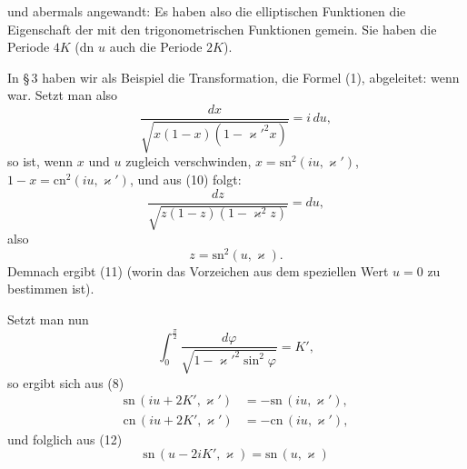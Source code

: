 
und abermals angewandt:
Es haben also die elliptischen Funktionen die Eigenschaft der  mit den trigonometrischen Funktionen gemein. Sie haben die Periode $4K$ (dn $u$ auch die Periode $2K$).

In §\,3 haben wir als Beispiel die Transformation, die Formel (1), abgeleitet:
wenn
war. Setzt man also
\[
\frac{dx}{\sqrt{x(1-x)(1-\varkappa'^2x)}} = i\,du,
\]
so ist, wenn $x$ und $u$ zugleich verschwinden, $x = \mathrm{sn}^2(iu,\varkappa')$, $1-x = \mathrm{cn}^2(iu,\varkappa')$, und aus (10) folgt:
\[
\frac{dz}{\sqrt{z(1-z)(1-\varkappa^2z)}} = du,
\]
also
\[
z = \mathrm{sn}^2(u,\varkappa).
\]
Demnach ergibt (11)
(worin das Vorzeichen aus dem speziellen Wert $u=0$ zu bestimmen ist).

Setzt man nun
\[
\int_0^{\frac{\pi}{2}} \frac{d\varphi}{\sqrt{1-\varkappa'^2\sin^2\varphi}} = K',
\]
so ergibt sich aus (8)
\[
\begin{aligned}
\mathrm{sn}\,(iu+2K',\varkappa') &= -\mathrm{sn}\,(iu,\varkappa'),\\
\mathrm{cn}\,(iu+2K',\varkappa') &= -\mathrm{cn}\,(iu,\varkappa'),
\end{aligned}
\]
und folglich aus (12)
\[
\mathrm{sn}\,(u-2iK',\varkappa) = \mathrm{sn}\,(u,\varkappa)
\]
